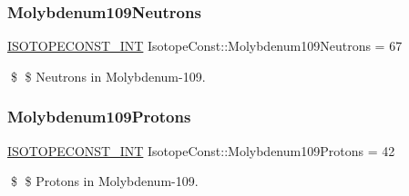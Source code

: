 \subsubsection{\texorpdfstring{Molybdenum109\+Neutrons}{Molybdenum109Neutrons}}
{\footnotesize\ttfamily \mbox{\hyperlink{group___isotope_const-_macros_ga5f18360b3e99483a35c32d789e62621c}{I\+S\+O\+T\+O\+P\+E\+C\+O\+N\+S\+T\+\_\+\+I\+NT}} Isotope\+Const\+::\+Molybdenum109\+Neutrons = 67}

\$ \$ Neutrons in Molybdenum-\/109. \mbox{\label{group___isotope_const-_molybdenum-_mo109_ga9231eac227aa21aba2f38a8f147638e2}} 
\subsubsection{\texorpdfstring{Molybdenum109\+Protons}{Molybdenum109Protons}}
{\footnotesize\ttfamily \mbox{\hyperlink{group___isotope_const-_macros_ga5f18360b3e99483a35c32d789e62621c}{I\+S\+O\+T\+O\+P\+E\+C\+O\+N\+S\+T\+\_\+\+I\+NT}} Isotope\+Const\+::\+Molybdenum109\+Protons = 42}

\$ \$ Protons in Molybdenum-\/109. 